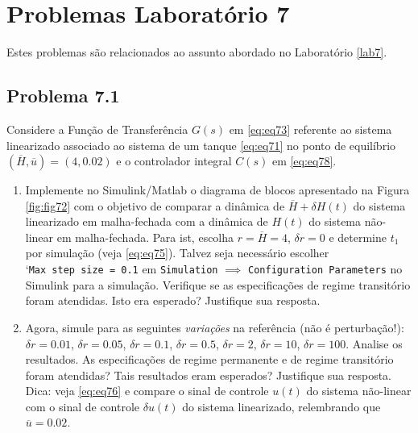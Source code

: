 \documentclass[
]{book}
\providecommand{\tightlist}{%
  \setlength{\itemsep}{0pt}\setlength{\parskip}{0pt}}
\theoremstyle{definition}
\theoremstyle{definition}
\theoremstyle{definition}
\theoremstyle{remark}
\begin{document}
\hypertarget{problemas-laboratuxf3rio-7}{%
\chapter*{Problemas Laboratório 7}\label{problemas-laboratuxf3rio-7}}

Estes problemas são relacionados ao assunto abordado no Laboratório \ref{lab7}.

\hypertarget{problema-7.1}{%
\section*{Problema 7.1}\label{problema-7.1}}

Considere a Função de Transferência \(G(s)\) em \eqref{eq:eq73} referente ao sistema linearizado associado ao sistema de um tanque \eqref{eq:eq71} no ponto de equilíbrio \((\overline{H}, \overline{u}) = (4, 0.02)\) e o controlador integral \(C(s)\) em \eqref{eq:eq78}.

\begin{enumerate}
\def\labelenumi{(\alph{enumi})}
\tightlist
\item
  Implemente no Simulink/Matlab o diagrama de blocos apresentado na Figura \ref{fig:fig72} com o objetivo de comparar a dinâmica de \(\overline{H} + \delta H(t)\) do sistema linearizado em malha-fechada com a dinâmica de \(H(t)\) do sistema não-linear em malha-fechada. Para ist, escolha \(r= \overline{H} = 4\), \(\delta r = 0\) e determine \(t_1\) por simulação (veja \eqref{eq:eq75}). Talvez seja necessário escolher `\texttt{Max\ step\ size\ =\ 0.1} em \texttt{Simulation} \(\implies\) \texttt{Configuration\ Parameters} no Simulink para a simulação. Verifique se as especificações de regime transitório foram atendidas. Isto era esperado? Justifique sua resposta.
\item
  Agora, simule para as seguintes \emph{variações} na referência (não é perturbação!): \(\delta r = 0.01\), \(\delta r = 0.05\), \(\delta r = 0.1\), \(\delta r = 0.5\), \(\delta r = 2\), \(\delta r = 10\), \(\delta r = 100\). Analise os resultados. As especificações de regime permanente e de regime transitório foram atendidas? Tais resultados eram esperados? Justifique sua resposta. Dica: veja \eqref{eq:eq76} e compare o sinal de controle \(u(t)\) do sistema não-linear com o sinal de controle \(\delta u(t)\) do sistema linearizado, relembrando que \(\overline{u} = 0.02\).
\end{enumerate}
\end{document}
